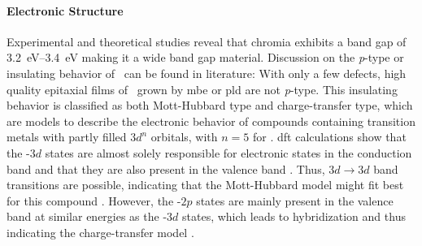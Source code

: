 \paragraph{Electronic Structure}
Experimental and theoretical studies reveal that chromia exhibits a band gap of \qtyrange{3.2}{3.4}{\eV}
    \cite{mi2018,robbert1998,lebreau2014,arca2013}
making it a wide band gap material.
Discussion on the \textit{p}-type or insulating behavior of \cro\ can be found in literature:
With only a few defects, high quality epitaxial films of \cro\ grown by \gls{mbe}
    \cite{farrell2015}
or \gls{pld}
    \cite{kehoe2016}
are not \textit{p}-type.
This insulating behavior is classified as both Mott-Hubbard type and charge-transfer type, which are models to describe the electronic behavior of compounds containing transition metals with partly filled $3d^n$ orbitals, with $n=5$ for 
    \cite{catti1996,mi2018,lebreau2014}.
\gls{dft} calculations show that the -$3d$ states are almost solely responsible for electronic states in the conduction band and that they are also present in the valence band
    \cite{mi2018,lebreau2014}.
Thus, $3d\longrightarrow 3d$ band transitions are possible, indicating that the Mott-Hubbard model might fit best for this compound
    \cite{lebreau2014}.
However, the -$2p$ states are mainly present in the valence band at similar energies as the -$3d$ states, which leads to hybridization and thus indicating the charge-transfer model
    \cite{lebreau2014}.

